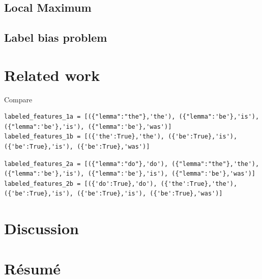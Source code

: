 \documentclass[a4paper]{article}
\begin{document}
\subsection{Local Maximum}

\subsection{Label bias problem}

\section{Related work}
Compare
\begin{lstlisting}
labeled_features_1a = [({"lemma":"the"},'the'), ({"lemma":'be'},'is'), ({"lemma":'be'},'is'), ({"lemma":'be'},'was')]
labeled_features_1b = [({'the':True},'the'), ({'be':True},'is'), ({'be':True},'is'), ({'be':True},'was')]
\end{lstlisting}

\begin{lstlisting}
labeled_features_2a = [({"lemma":"do"},'do'), ({"lemma":"the"},'the'), ({"lemma":'be'},'is'), ({"lemma":'be'},'is'), ({"lemma":'be'},'was')]
labeled_features_2b = [({'do':True},'do'), ({'the':True},'the'), ({'be':True},'is'), ({'be':True},'is'), ({'be':True},'was')]
\end{lstlisting}

\section{Discussion}
\section{Résumé}
\cite{greenwade93}




\end{document}

